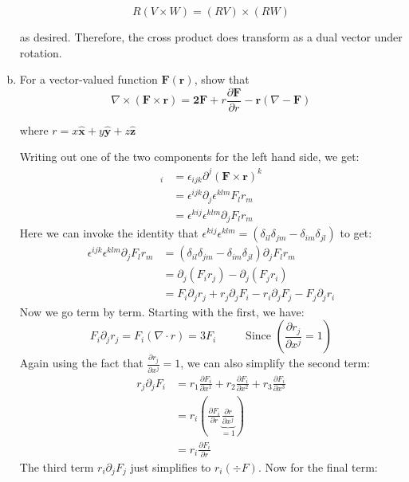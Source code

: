 \documentclass[10pt]{article}
\begin{document}
\begin{enumerate}[(a)]
\begin{solution}
            \[ R(V \times W) = (RV) \times (RW)\] 

            as desired. Therefore, the cross product does transform as a dual vector under rotation.
        \end{solution}
        \item For a vector-valued function $\mathbf{F(r)}$, show that 
        \[ \nabla \times \mathbf{(F \times r) = 2F} + r \frac{\partial \mathbf F}{\partial r} - \mathbf r(\nabla - \mathbf F)\] 
        
        where $r = x \mathbf{\hat x} + y \mathbf{\hat y} + z\mathbf{\hat z}$

        \begin{solution}
            Writing out one of the two components for the left hand side, we get: 
                \begin{align*}
                    [\curl(\mathbf{F}\times\mathbf{r})]_{i} &= \epsilon_{ijk}\partial^{j}(\mathbf{F}\times\mathbf{r})^{k} \\
                    &= \epsilon^{ijk}\partial_j\epsilon^{klm}F_lr_m \\
                    &= \epsilon^{kij}\epsilon^{klm}\partial_jF_lr_m
                \end{align*}
                Here we can invoke the identity that $\epsilon^{kij}\epsilon^{klm} = (\delta_{il}\delta_{jm} - \delta_{im}\delta_{jl})$ to get: 
                \begin{align*}
                    \epsilon^{ijk}\epsilon^{klm}\partial_j F_l r_m &= (\delta_{il}\delta_{jm} - \delta_{im}\delta_{jl})\partial_jF_lr_m\\
                    &= \partial_j(F_ir_j)-\partial_j(F_jr_i) \\
                    &= F_i\partial_jr_j + r_j\partial_jF_i-r_i\partial_jF_j-F_j\partial_jr_i
                \end{align*}
                Now we go term by term. Starting with the first, we have: 
                \[ F_i \partial_j r_j = F_i (\nabla \cdot r) = 3F_i  \phantom{aaaaa} \text{Since } \left( \frac{\partial r_j}{\partial x^j} = 1\right)\]
                Again using the fact that $\frac{\partial r_j}{\partial x^j} = 1$, we can also simplify the second term: 
                \begin{align*}
                    r_j\partial_jF_i &= r_1\frac{\partial F_i}{\partial x^1} + r_2\frac{\partial F_i}{\partial x^2} + r_3\frac{\partial F_i}{\partial x^3} \\
                    &= r_i \left( \frac{\partial F_i}{\partial r} \underbrace{\frac{\partial r}{\partial x^j}}_{= 1}\right)\\
                    &= r_i \frac{\partial F_i}{\partial r}
                \end{align*}
                The third term $r_i \partial_j F_j$ just simplifies to $r_i (\div F)$. Now for the final term:


\end{solution}
\end{enumerate}
\end{document}
